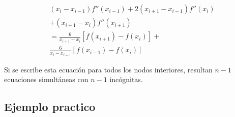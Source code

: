 \documentclass[conference]{IEEEtran}
\begin{document}
\begin{multline}
	(x_{i} - x_{i - 1})f''(x_{i - 1}) + 2(x_{i + 1} - x_{i - 1})f''(x_{i}) \\
	+ (x_{i + 1} - x_{i})f''(x_{i + 1}) \\
	= \frac{6}{x_{i + 1} - x_{i}}[f(x_{i + 1}) - f(x_{i})] + \\
	\frac{6}{x_{i} - x_{i - 1}}[f(x_{i - 1}) - f(x_{i})]
	\label{eq:18.37}
\end{multline}

Si se escribe esta ecuación para todos los nodos interiores,
resultan $n - 1$ ecuaciones simultáneas con $n - 1$ incógnitas.

\subsection*{Ejemplo practico} %


\end{document}
